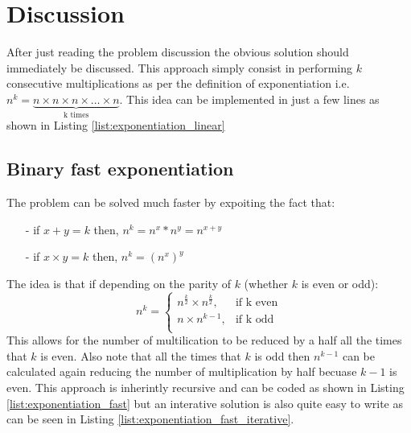 \section{Discussion}
\label{exponentiation:sec:discussion}
After just reading the problem discussion the obvious solution should immediately be discussed. This approach simply consist in performing $k$ consecutive multiplications as per the definition of exponentiation i.e. $n^k = \underbrace{n \times n \times n \times \ldots \times n}_\text{k times}$. This idea can be implemented in just a few lines as shown in Listing \ref{list:exponentiation_linear}



\subsection{Binary fast exponentiation}
\label{exponentiation:sec:fast_exponentiation}
The problem can be solved much faster by expoiting the fact that:
\begin{itemize}
	\item[-] if $x+y=k$ then, $n^k = n^x * n^y = n^{x+y}$ 
	\item[-] if $x \times y=k$ then, $ n^k = (n^x)^y$
\end{itemize}
The idea is that if depending on the parity of $k$ (whether $k$ is even or odd):
  \[
    n^k = \begin{cases}
        		n^{\frac{k}{2}} \times n^{\frac{k}{2}}, & \text{if  k even}\\
        		n \times n^{k-1}, & \text{if k odd}\\
	        \end{cases}
  \]
This allows for the number of multilication to be reduced by a half all the times that $k$ is even. Also note that all the times that $k$ is odd then $n^{k-1}$ can be calculated again reducing the number of multiplication by half becuase $k-1$ is even. This approach is inherintly recursive and can be coded as shown in Listing \ref{list:exponentiation_fast} but an interative solution is also quite easy to write as can be seen in Listing \ref{list:exponentiation_fast_iterative}.




